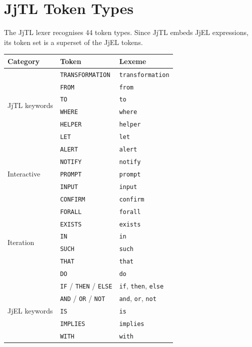 \documentclass[11pt,a4paper]{article}
\newcommand{\jjel}{\textsf{JjEL}}
\newcommand{\jjtl}{\textsf{JjTL}}
\begin{document}
\section{JjTL Token Types}\label{app:tokens}

The \jjtl{} lexer recognises 44 token types. Since \jjtl{} embeds \jjel{} expressions, its token set is a superset of the \jjel{} tokens.

\begin{center}
\small
\begin{tabular}{@{}lll@{}}
\toprule
\textbf{Category} & \textbf{Token} & \textbf{Lexeme} \\
\midrule
\multirow{6}{*}{JjTL keywords}
& \texttt{TRANSFORMATION} & \texttt{transformation} \\
& \texttt{FROM} & \texttt{from} \\
& \texttt{TO} & \texttt{to} \\
& \texttt{WHERE} & \texttt{where} \\
& \texttt{HELPER} & \texttt{helper} \\
& \texttt{LET} & \texttt{let} \\
\midrule
\multirow{5}{*}{Interactive}
& \texttt{ALERT} & \texttt{alert} \\
& \texttt{NOTIFY} & \texttt{notify} \\
& \texttt{PROMPT} & \texttt{prompt} \\
& \texttt{INPUT} & \texttt{input} \\
& \texttt{CONFIRM} & \texttt{confirm} \\
\midrule
\multirow{6}{*}{Iteration}
& \texttt{FORALL} & \texttt{forall} \\
& \texttt{EXISTS} & \texttt{exists} \\
& \texttt{IN} & \texttt{in} \\
& \texttt{SUCH} & \texttt{such} \\
& \texttt{THAT} & \texttt{that} \\
& \texttt{DO} & \texttt{do} \\
\midrule
\multirow{7}{*}{JjEL keywords}
& \texttt{IF} / \texttt{THEN} / \texttt{ELSE} & \texttt{if}, \texttt{then}, \texttt{else} \\
& \texttt{AND} / \texttt{OR} / \texttt{NOT} & \texttt{and}, \texttt{or}, \texttt{not} \\
& \texttt{IS} & \texttt{is} \\
& \texttt{IMPLIES} & \texttt{implies} \\
& \texttt{WITH} & \texttt{with} \\

\end{tabular}
\end{center}
\end{document}
